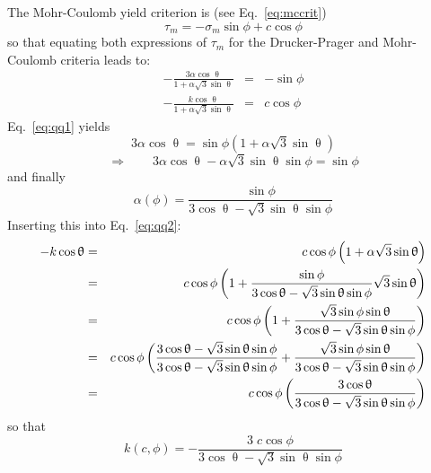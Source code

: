 The Mohr-Coulomb yield criterion is  (see Eq.~\eqref{eq:mccrit})
\[
\tau_m = -\sigma_m \sin\phi + c \cos\phi
\]
so that equating both expressions of $\tau_m$ for the Drucker-Prager 
and Mohr-Coulomb criteria leads to:
\begin{eqnarray}
-\frac{3 \alpha \cos\uptheta}{1 + \alpha \sqrt{3}\sin\uptheta} &=& -\sin\phi \label{eq:qq1}\\
-\frac{k\cos\uptheta}{1 + \alpha \sqrt{3}\sin\uptheta} &=& c \cos\phi \label{eq:qq2}
\end{eqnarray}
Eq.~\eqref{eq:qq1} yields
\[
3 \alpha \cos\uptheta = \sin\phi (1 + \alpha \sqrt{3}\sin\uptheta) 
\]
\[
\Rightarrow \qquad 3 \alpha \cos\uptheta - \alpha \sqrt{3}\sin\uptheta \sin\phi = \sin\phi 
\]
and finally 
\[
\boxed{
\alpha(\phi) =  \frac{\sin\phi}{ 3 \cos\uptheta - \sqrt{3}\sin\uptheta \sin\phi}
}
\]
Inserting this into Eq.~\eqref{eq:qq2}:
\begin{eqnarray}
- k \cos\uptheta 
&=& c \cos \phi \left(1 +\alpha \sqrt{3} \sin\uptheta \right)  \nonumber\\
&=& c \cos \phi \left(1 + \frac{\sin\phi}{ 3 \cos\uptheta - \sqrt{3}\sin\uptheta \sin\phi}  \sqrt{3} \sin\uptheta\right) \nonumber\\
&=& c \cos \phi \left(1 + 
\frac{ \sqrt{3}\sin\phi \sin\uptheta }{ 3 \cos\uptheta - \sqrt{3}\sin\uptheta \sin\phi} \right) \nonumber\\
&=& c \cos \phi \left(
\frac{ 3 \cos\uptheta - \sqrt{3}\sin\uptheta \sin\phi}{ 3 \cos\uptheta - \sqrt{3}\sin\uptheta \sin\phi} 
+ 
\frac{ \sqrt{3}\sin\phi \sin\uptheta }{ 3 \cos\uptheta - \sqrt{3}\sin\uptheta \sin\phi} \right) \nonumber\\
&=& c \cos \phi \left(
\frac{ 3 \cos\uptheta}{ 3 \cos\uptheta - \sqrt{3}\sin\uptheta \sin\phi} \right) \nonumber
\end{eqnarray}
so that 
\[
\boxed{
k(c,\phi) =- \frac{ 3\; c \cos \phi }{ 3 \cos\uptheta - \sqrt{3}\sin\uptheta \sin\phi} 
}
\]

